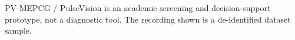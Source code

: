 \begin{table}[htbp]
  \par\footnotesize PV-MEPCG / PulseVision is an academic screening and decision-support prototype, not a diagnostic tool. The recording shown is a de-identified dataset sample.
\end{table}
